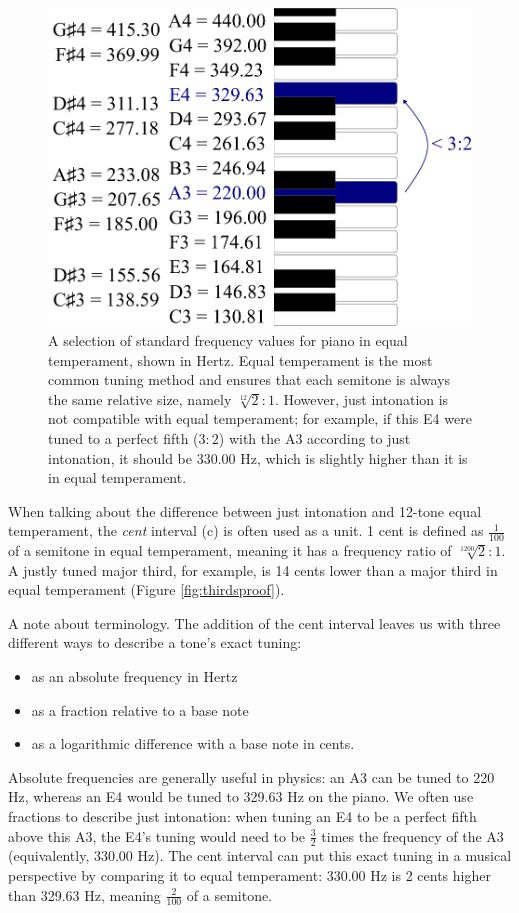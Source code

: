 \documentclass[a4paper]{article}
\begin{document}
\begin{figure}
	\centering
	\includegraphics[height=0.35\textheight]{Figures/12TET.pdf} %
	\caption{A selection of standard frequency values for piano in equal temperament, shown in Hertz. Equal temperament is the most common tuning method and ensures that each semitone is always the same relative size, namely $\sqrt[12]{2}:1$. However, just intonation is not compatible with equal temperament; for example, if this E4 were tuned to a perfect fifth ($3:2$) with the A3 according to just intonation, it should be $330.00$ Hz, which is slightly higher than it is in equal temperament.}
	\label{fig:12TET}
\end{figure}

When talking about the difference between just intonation and 12-tone equal temperament, the \textit{cent} interval (c) is often used as a unit. 1 cent is defined as $\frac{1}{100}$ of a semitone in equal temperament, meaning it has a frequency ratio of $\sqrt[1200]{2}:1$. A justly tuned major third, for example, is 14 cents lower than a major third in equal temperament (Figure \ref{fig:thirdsproof}).

A note about terminology. The addition of the cent interval leaves us with three different ways to describe a tone's exact tuning:
\begin{itemize}
	\item as an absolute frequency in Hertz
	\item as a fraction relative to a base note
	\item as a logarithmic difference with a base note in cents.
\end{itemize}
Absolute frequencies are generally useful in physics: an A3 can be tuned to 220 Hz, whereas an E4 would be tuned to 329.63 Hz on the piano. We often use fractions to describe just intonation: when tuning an E4 to be a perfect fifth above this A3, the E4's tuning would need to be $\frac32$ times the frequency of the A3 (equivalently, 330.00 Hz). The cent interval can put this exact tuning in a musical perspective by comparing it to equal temperament: 330.00 Hz is 2 cents higher than 329.63 Hz, meaning $\frac{2}{100}$ of a semitone.
\end{document}
